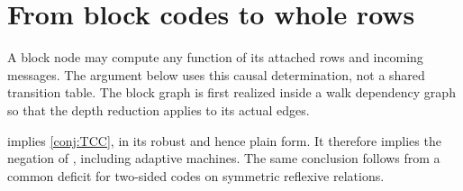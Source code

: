 \section{From block codes to whole rows}\label{sec:tape}

A block node may compute any function of its attached rows and incoming messages. The argument below uses this
causal determination, not a shared transition table. The block graph is first realized inside a walk dependency
graph so that the depth reduction applies to its actual edges.

\begin{theorem}\label{thm:T}
 implies \cref{conj:TCC}, in its robust and hence plain form. It therefore implies
the negation of , including adaptive machines. The same conclusion follows from a
common deficit for two-sided codes on symmetric reflexive relations.
\end{theorem}
